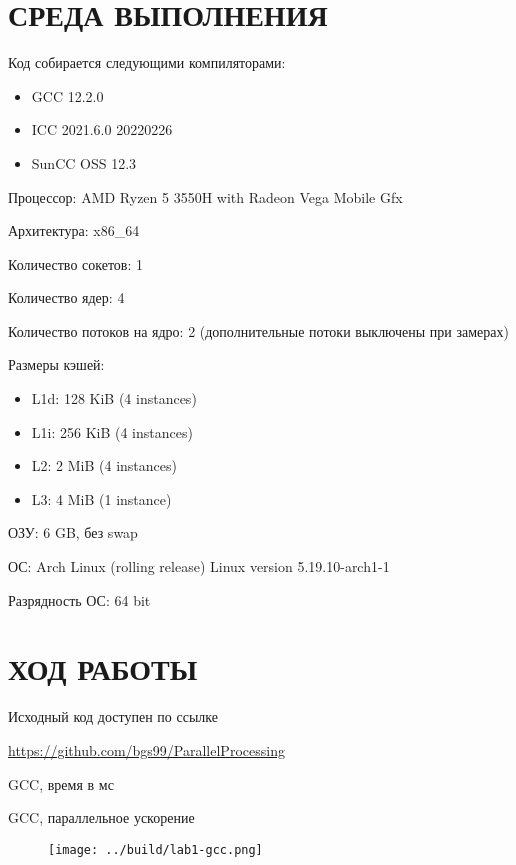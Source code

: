 \documentclass[14pt, a4paper, oneside, final]{extarticle}
\begin{document}
\clearpage
\section*{СРЕДА ВЫПОЛНЕНИЯ}

Код собирается следующими компиляторами:
\begin{itemize}
 \setlength{\itemindent}{3em}
 \item GCC 12.2.0
 \item ICC 2021.6.0 20220226
 \item SunCC OSS 12.3
\end{itemize}

Процессор: AMD Ryzen 5 3550H with Radeon Vega Mobile Gfx

Архитектура: x86\_64

Количество сокетов: 1

Количество ядер: 4

Количество потоков на ядро: 2 (дополнительные потоки выключены при замерах)

Размеры кэшей:
\begin{itemize}
 \setlength{\itemindent}{3em}
 \item L1d: 128 KiB (4 instances)
 \item L1i: 256 KiB (4 instances)
 \item L2: 2 MiB (4 instances)
 \item L3: 4 MiB (1 instance)
\end{itemize}

ОЗУ: 6 GB, без swap

ОС: Arch Linux (rolling release) Linux version 5.19.10-arch1-1

Разрядность ОС: 64 bit


\clearpage
\section*{ХОД РАБОТЫ}
Исходный код доступен по ссылке

\url{https://github.com/bgs99/ParallelProcessing}

\clearpage
GCC, время в мс


GCC, параллельное ускорение


\begin{figure}[ht!]

\texttt{[image: ../build/lab1-gcc.png]}
\end{figure}
\end{document}
